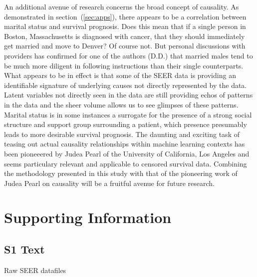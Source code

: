 \documentclass[10pt,letterpaper]{article}
\begin{document}
An additional avenue of research concerns the broad concept of causality. As demonstrated in section~(\ref{sec:apps}), there appears to be a correlation between marital status and survival prognosis. Does this mean that if a single person in Boston, Massachusetts is diagnosed with cancer, that they should immediately get married and move to Denver? Of course not. 
But personal discussions with providers has confirmed for one of the authors (D.D.) that married males tend to be much more diligent in following instructions than their single counterparts. What appears to be in effect is that some of the SEER data is providing an identifiable signature of underlying causes not directly represented by the data. Latent variables not directly seen in the data are still providing echos of patterns in the data and the sheer volume allows us to see glimpses of these patterns. Marital status is in some instances a surrogate for the presence of a strong social structure and support group surrounding a patient, which presence presumably leads to more desirable survival prognosis. 
The daunting and exciting task of teasing out actual causality relationships within machine learning contexts has been pioneeered by Judea Pearl of the University of California, Los Angeles and seems particulary relevant and applicable to censored survival data. Combining the methodology presented in this study with that of the pioneering work of Judea Pearl on causality will be a fruitful avenue for future research.



\section*{Supporting Information}
\label{sec:supporting}





\subsection*{S1 Text}
\label{S1_Text}

Raw SEER datafiles
\end{document}
